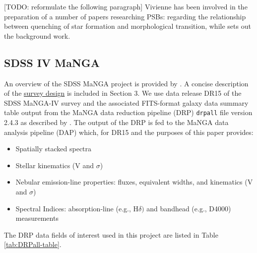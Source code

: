 [TODO: reformulate the following paragraph]
Vivienne has been involved in the preparation of a number of papers researching PSBs: \citet{2017MNRAS.472.1401A} regarding the relationship between quenching of star formation and morphological transition, while \citet{2016MNRAS.463..832W} sets out the background work.


\subsection{SDSS IV MaNGA}
An overview of the SDSS MaNGA project is provided by \citet{2015ApJ...798....7B}. A concise description of the \href{https://iopscience.iop.org/article/10.1088/0004-637X/798/1/7/meta#apj504473s3}{survey design} is included in Section 3. We use data release DR15 of the SDSS MaNGA-IV survey \citep{2019ApJS..240...23A} and the associated FITS-format galaxy data summary table output from the MaNGA data reduction pipeline (DRP) \texttt{drpall} file version 2.4.3 as described by \citet{2016AJ....152...83L}. The output of the DRP is fed to the MaNGA data analysis pipeline (DAP) which, for DR15 and the purposes of this paper provides:
\begin{itemize}
    \item Spatially stacked spectra
    \item Stellar kinematics (V and $\sigma$)
    \item Nebular emission-line properties: fluxes, equivalent widths, and kinematics (V and $\sigma$)
    \item Spectral Indices: absorption-line (e.g., H$\delta)$ and bandhead (e.g., D4000) measurements
\end{itemize}

The DRP data fields of interest used in this project are listed in Table \ref{tab:DRPall-table}.

